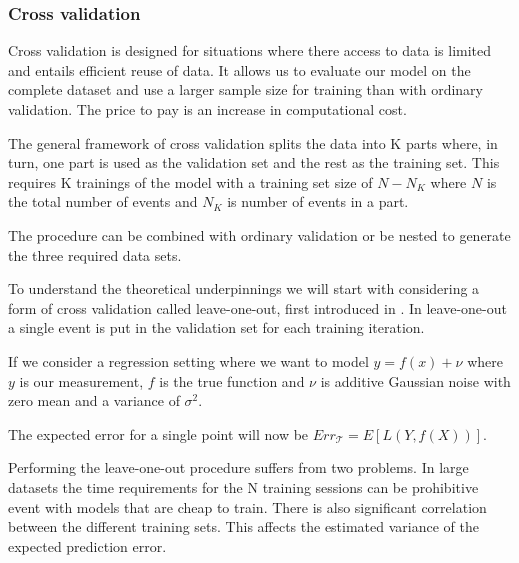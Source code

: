

\subsubsection{Cross validation}
Cross validation is designed for situations where there access to data is limited and entails efficient reuse of data. It allows us to evaluate our model on the complete dataset and use a larger sample size for training than with ordinary validation.  The price to pay is an increase in computational cost.

The general framework of cross validation splits the data into K parts where, in turn, one part is used as the validation set and the rest as the training set. This requires K trainings of the model with a training set size of $N - N_K$ where $N$ is the total number of events and $N_K$ is number of events in a part.

The procedure can be combined with ordinary validation or be nested to generate the three required data sets.



To understand the theoretical underpinnings we will start with considering a form of cross validation called leave-one-out, first introduced in \cite{loo-paper}. In leave-one-out a single event is put in the validation set for each training iteration.

If we consider a regression setting where we want to model $y = f(x) + \nu$ where $y$ is our measurement, $f$ is the true function and $\nu$ is additive Gaussian noise with zero mean and a variance of $\sigma^2$. 

The expected error for a single point will now be $Err_{\mathcal{T}} = E\left[ L(Y, f(X)) \right]$.

Performing the leave-one-out procedure suffers from two problems. In large datasets the time requirements for the N training sessions can be prohibitive event with models that are cheap to train. There is also significant correlation between the different training sets. This affects the estimated variance of the expected prediction error.


